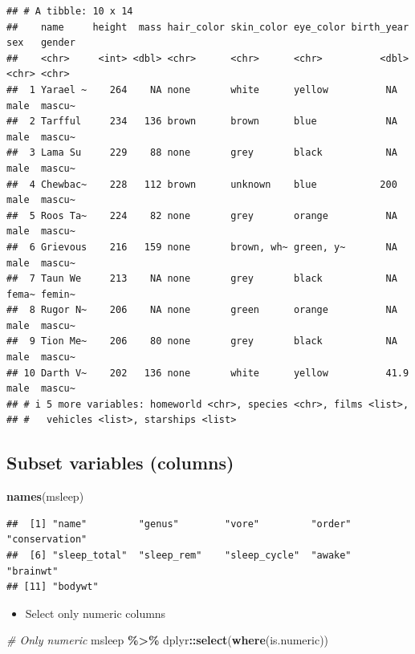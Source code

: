 \documentclass[
]{book}
\newenvironment{Shaded}{\begin{snugshade}}{\end{snugshade}}
\newcommand{\CommentTok}[1]{\textcolor[rgb]{0.56,0.35,0.01}{\textit{#1}}}
\newcommand{\FunctionTok}[1]{\textcolor[rgb]{0.13,0.29,0.53}{\textbf{#1}}}
\newcommand{\NormalTok}[1]{#1}
\newcommand{\SpecialCharTok}[1]{\textcolor[rgb]{0.81,0.36,0.00}{\textbf{#1}}}
\providecommand{\tightlist}{%
  \setlength{\itemsep}{0pt}\setlength{\parskip}{0pt}}
\begin{document}
\begin{verbatim}
## # A tibble: 10 x 14
##    name     height  mass hair_color skin_color eye_color birth_year sex   gender
##    <chr>     <int> <dbl> <chr>      <chr>      <chr>          <dbl> <chr> <chr> 
##  1 Yarael ~    264    NA none       white      yellow          NA   male  mascu~
##  2 Tarfful     234   136 brown      brown      blue            NA   male  mascu~
##  3 Lama Su     229    88 none       grey       black           NA   male  mascu~
##  4 Chewbac~    228   112 brown      unknown    blue           200   male  mascu~
##  5 Roos Ta~    224    82 none       grey       orange          NA   male  mascu~
##  6 Grievous    216   159 none       brown, wh~ green, y~       NA   male  mascu~
##  7 Taun We     213    NA none       grey       black           NA   fema~ femin~
##  8 Rugor N~    206    NA none       green      orange          NA   male  mascu~
##  9 Tion Me~    206    80 none       grey       black           NA   male  mascu~
## 10 Darth V~    202   136 none       white      yellow          41.9 male  mascu~
## # i 5 more variables: homeworld <chr>, species <chr>, films <list>,
## #   vehicles <list>, starships <list>
\end{verbatim}

\subsection{Subset variables (columns)}\label{subset-variables-columns}

\begin{Shaded}
\begin{Highlighting}[]
\FunctionTok{names}\NormalTok{(msleep)}
\end{Highlighting}
\end{Shaded}

\begin{verbatim}
##  [1] "name"         "genus"        "vore"         "order"        "conservation"
##  [6] "sleep_total"  "sleep_rem"    "sleep_cycle"  "awake"        "brainwt"     
## [11] "bodywt"
\end{verbatim}

\begin{itemize}
\tightlist
\item
  Select only numeric columns
\end{itemize}

\begin{Shaded}
\begin{Highlighting}[]
\CommentTok{\# Only numeric}
\NormalTok{msleep }\SpecialCharTok{\%\textgreater{}\%}
\NormalTok{  dplyr}\SpecialCharTok{::}\FunctionTok{select}\NormalTok{(}\FunctionTok{where}\NormalTok{(is.numeric))}
\end{Highlighting}
\end{Shaded}
\end{document}
